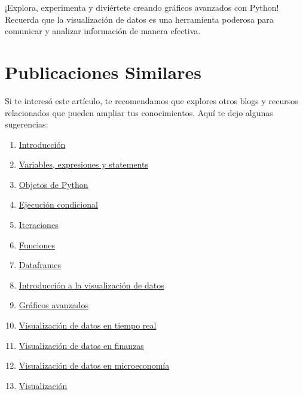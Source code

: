 \documentclass[
  a4paper,
]{article}
\begin{document}
¡Explora, experimenta y diviértete creando gráficos avanzados con
Python! Recuerda que la visualización de datos es una herramienta
poderosa para comunicar y analizar información de manera efectiva.

\hypertarget{publicaciones-similares}{%
\section{Publicaciones Similares}\label{publicaciones-similares}}

Si te interesó este artículo, te recomendamos que explores otros blogs y
recursos relacionados que pueden ampliar tus conocimientos. Aquí te dejo
algunas sugerencias:

\begin{enumerate}
\def\labelenumi{\arabic{enumi}.}
\item
  \href{../2023-06-22-01-introduccion-a-python/index.qmd}{Introducción}
\item
  \href{../2023-06-23-02-variables-expresiones-y-statements-con-python/index.qmd}{Variables,
  expresiones y statements}
\item
  \href{../2023-06-24-03-objetos-de-python/index.qmd}{Objetos de Python}
\item
  \href{../2023-06-25-04-ejecucion-condicional-con-python/index.qmd}{Ejecución
  condicional}
\item
  \href{../2023-06-26-05-iteraciones-con-python/index.qmd}{Iteraciones}
\item
  \href{../2023-06-27-06-funciones-con-python/index.qmd}{Funciones}
\item
  \href{../2023-06-28-07-dataframes-con-python/index.qmd}{Dataframes}
\item
  \href{../2023-06-29-introduccion-a-la-visualizacion-de-datos-con-python/index.qmd}{Introducción
  a la visualización de datos}
\item
  \href{../2023-06-30-graficos-avanzados-con-python/index.qmd}{Gráficos
  avanzados}
\item
  \href{../2023-07-01-visualizacion-de-datos-en-tiempo-real-con-python/index.qmd}{Visualización
  de datos en tiempo real}
\item
  \href{../2023-07-02-visualizacion-de-datos-en-finanzas-con-python/index.qmd}{Visualización
  de datos en finanzas}
\item
  \href{../2023-07-03-visualizacion-de-datos-en-microeconomia-con-python/index.qmd}{Visualización
  de datos en microeconomía}
\item
  \href{../2023-07-04-visualizacion-de-datos-en-macroeconomia-con-python/index.qmd}{Visualización
}
\end{enumerate}
\end{document}
